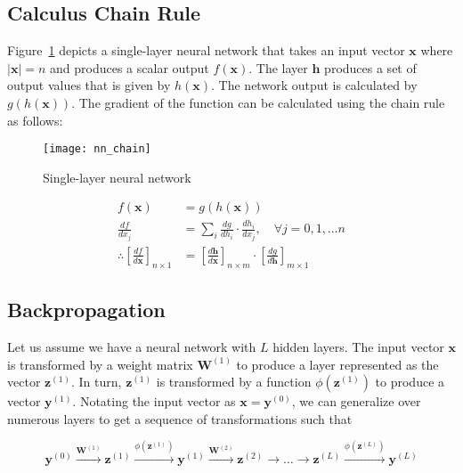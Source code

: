 \documentclass[10pt]{article}
\theoremstyle{definition}
\begin{document}
\subsection*{Calculus Chain Rule}

Figure~\ref{fig:sl_nn} depicts a single-layer neural network that takes an input vector $\mathbf{x}$ where $\lvert \mathbf{x} \rvert = n$ and produces a scalar output $f(\mathbf{x})$. The layer $\mathbf{h}$ produces a set of output values that is given by $h(\mathbf{x})$. The network output is calculated by $g(h(\mathbf{x}))$. The gradient of the function can be calculated using the chain rule as follows:

\begin{figure}[t]
\centering
\texttt{[image: nn\_chain]}
\caption{Single-layer neural network}
\label{fig:sl_nn}
\end{figure}

\begin{equation*}
\begin{aligned}
f(\mathbf{x}) & = g(h(\mathbf{x})) \\
\frac{df}{dx_j} & = \sum\limits_i \frac{dg}{dh_i} \cdot \frac{dh_i}{dx_j}, \quad \forall j = 0, 1, \hdots n\\
\therefore \left[\frac{df}{d\mathbf{x}}\right]_{n\times 1} & = \left[\frac{d\mathbf{h}}{d\mathbf{x}}\right]_{n\times m} \cdot \left[\frac{dg}{d\mathbf{h}}\right]_{m\times 1}
\end{aligned}
\end{equation*}

\subsection*{Backpropagation}

Let us assume we have a neural network with $L$ hidden layers. The input vector $\mathbf{x}$ is transformed by a weight matrix $\mathbf{W}^{(1)}$ to produce a layer represented as the vector $\mathbf{z}^{(1)}$. In turn, $\mathbf{z}^{(1)}$ is transformed by a function $\phi(\mathbf{z}^{(1)})$ to produce a vector $\mathbf{y}^{(1)}$. Notating the input vector as $\mathbf{x} = \mathbf{y}^{(0)}$, we can generalize over numerous layers to get a sequence of transformations such that

$$
\mathbf{y}^{(0)} \xrightarrow{\mathbf{W}^{(1)}} \mathbf{z}^{(1)} \xrightarrow{\phi(\mathbf{z}^{(1)})} \mathbf{y}^{(1)} \xrightarrow{\mathbf{W}^{(2)}} \mathbf{z}^{(2)} \rightarrow \hdots \rightarrow \mathbf{z}^{(L)} \xrightarrow{\phi(\mathbf{z}^{(L)})} \mathbf{y}^{(L)}
$$
\end{document}
